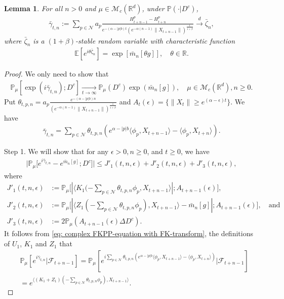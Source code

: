 \documentclass[12pt,a4paper]{amsart}
\theoremstyle{plain}
\newtheorem{lem}[thm]{Lemma}
\theoremstyle{definition}
\numberwithin{equation}{section}
\begin{document}
\begin{lem}
    For all $n>0$ and $\mu\in\mathcal{M}_c(\mathbb{R}^d)$, under $\mathbb{P}(\cdot|D^c)$,
\begin{align}
    \bar{\gamma}_{t,n}:=\sum_{p\in\mathcal{N}}a_p\frac{H^p_{t+n-1}-H^p_{t+n}}{e^{-(\alpha-|p|b)t}(e^{-\alpha(n-1)}\|X_{t+n-1}\|)^{\frac{1}{1+\beta}}}\xrightarrow{d}\bar{\zeta}_n,
\end{align}
    where $\bar{\zeta}_n$ is a $(1+\beta)$-stable random variable with characteristic function
\begin{align}
    \mathbb{E}[e^{i\theta \bar{\zeta}_n}]=\exp[\bar{m}_n[\theta g]],\quad \theta\in \mathbb{R}.
\end{align}
\end{lem}
\begin{proof}
    We only need to show that
\begin{align}
    \mathbb{P}_{\mu}[\exp(i\bar{\gamma}_{t,n}); D^c]
    \xrightarrow[t\rightarrow \infty]{}\mathbb{P}_{\mu}(D^c)\exp(\bar{m}_n[g]),
    \quad \mu \in \mathcal M_c(\mathbb R^d), n \geq 0.
\end{align}
    Put $\theta_{t,p,n}=a_p\frac{e^{-(\alpha-|p|b)n}}{(e^{-\alpha(n-1)}\|X_{t+n-1}\|)^{\frac{1}{1+\beta}}}$ and $A_t(\epsilon)=\{\|X_t\|\geq e^{(\alpha-\epsilon)t}\}$.
    We have
\begin{align}
    \bar{\gamma}_{t,n}=\sum_{p\in \mathcal{N}}\theta_{t,p,n}(e^{\alpha-|p|b}\langle \phi_p, X_{t+n-1}\rangle-\langle \phi_p, X_{t+n}\rangle).
\end{align}

	Step 1. We will show that for any $\epsilon > 0, n\geq 0$, and $t\geq 0$, we have
\begin{align}
    \big|\mathbb{P}_{\mu}\big[e^{i\bar{\gamma}_{t,n}}-e^{\bar{m}_n[g]}; D^c\big]\big|
    \leq J'_1(t,n,\epsilon)+J'_2(t,n,\epsilon)+J'_3(t,n,\epsilon),
\end{align}
	where
\begin{align}
\label{eq: Def of JJ1}
	J'_1(t,n,\epsilon)
	&:= \mathbb{P}_{\mu}\big[|\langle K_1(-\sum_{p\in \mathcal{N}}\theta_{t,p,n}\phi_p, X_{t+n-1}\rangle|; A_{t+n-1}(\epsilon) \big],
	\\ J'_2(t,n,\epsilon)
	&:= \mathbb{P}_{\mu}\big[|\langle Z_1(-\sum_{p\in \mathcal{N}}\theta_{t,p,n}\phi_p),X_{t+n-1}\rangle-\bar{m}_n[g]|; A_{t+n-1}(\epsilon)\big],\quad\mbox{and}
	\\ J'_3(t,n, \epsilon)
	&:=2\mathbb{P}_{\mu}(A_{t+n-1}(\epsilon)\Delta D^c).
\end{align}
    It follows from \eqref{eq: complex FKPP-equation with FK-transform}, the definitions of $U_1$, $K_1$ and $Z_1$ that
\begin{align}
\label{eq: need11}
    &\displaystyle\mathbb{P}_{\mu}[e^{i\bar{\gamma}_{t,n}}|\mathscr{F}_{t+n-1}]
    =\mathbb{P}_{\mu}[e^{i\sum_{p\in \mathcal{N}}\theta_{t,p,n}(e^{\alpha-|p|b}\langle \phi_p,X_{t+n-1}\rangle-\langle \phi_p, X_{t+n}\rangle)}|\mathscr{F}_{t+n-1}]
    \\&=\displaystyle e^{\langle (K_1+Z_1)(-\sum_{p\in \mathcal{N}}\theta_{t,p,n}\phi_p), X_{t+n-1} \rangle}.
\end{align}


\end{proof}
\end{document}

